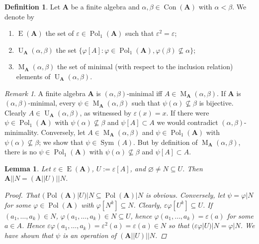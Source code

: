 \documentclass{amsart}
\theoremstyle{plain}
\newtheorem{lemma}[theorem]{Lemma}
\theoremstyle{definition}
\newtheorem{definition}[theorem]{Definition}
\theoremstyle{remark}
\newtheorem{remark}[theorem]{Remark}
\def\phi{\varphi}
\def\epsilon{\varepsilon}
\DeclareMathOperator{\Con}{Con}
\DeclareMathOperator{\Pol}{Pol}
\DeclareMathOperator{\Sym}{Sym}
\DeclareMathOperator{\Id}{E}
\DeclareMathOperator{\U}{U}
\DeclareMathOperator{\M}{M}
\begin{document}
\begin{definition}
    Let $\mathbf{A}$ be a finite algebra and $\alpha, \beta \in \Con(\mathbf{A})$ with $\alpha < \beta$. 
    We denote by
    \begin{enumerate}
        \item $\Id(\mathbf{A})$ the set of $ \epsilon \in \Pol_1(\mathbf{A})$ such that $\epsilon^2 = \epsilon$; 
        \item $\U_{\mathbf{A}}(\alpha, \beta)$ the set $\{\phi[A] : \phi \in \Pol_1(\mathbf{A}), \phi(\beta) \nsubseteq \alpha\}$; 
        \item $\M_{\mathbf{A}}(\alpha, \beta)$ the set of minimal (with respect to the inclusion relation) elements of $\U_{\mathbf{A}}(\alpha, \beta)$. 
    \end{enumerate}
\end{definition}

\begin{remark}
    A finite algebra $\mathbf{A}$ is $(\alpha, \beta)$-minimal iff $A \in \M_{\mathbf{A}}(\alpha, \beta)$. 
    If $\mathbf{A}$ is $(\alpha, \beta)$-minimal, every $\psi \in \M_{\mathbf{A}}(\alpha, \beta)$ such that $\psi(\alpha) \nsubseteq \beta$ is bijective. 
    Clearly $A \in \U_{\mathbf{A}}(\alpha, \beta)$, as witnessed by $\epsilon(x)=x$. 
    If there were $\psi \in \Pol_1(\mathbf{A})$ with $\psi(\alpha) \nsubseteq \beta$ and $\psi[A] \subset A$ we would contradict $(\alpha, \beta)$-minimality. 
    Conversely, let $A \in \M_{\mathbf{A}}(\alpha, \beta)$ and $\psi \in \Pol_1(\mathbf{A})$ with $\psi(\alpha) \nsubseteq \beta$; 
    we show that $\psi \in \Sym(A)$. 
    But by definition of $\M_{\mathbf{A}}(\alpha, \beta)$, there is no $\psi \in \Pol_1(\mathbf{A})$ with $\psi(\alpha) \nsubseteq \beta$ and $\psi[A] \subset A$. 
\end{remark}


\begin{lemma}
    \label{lemma_ex}
    Let $\epsilon \in \Id(\mathbf{A})$, $U:=\epsilon[A]$, and $\varnothing \neq N \subseteq U$.  
    Then $\mathbf{A}||N = (\mathbf{A}||U)||N$. 
    \begin{proof}
        That $(\Pol(\mathbf{A})|U)|N \subseteq \Pol(\mathbf{A})|N$ is obvious. 
        Conversely, let $\psi=\phi|N$ for some $\phi \in \Pol(\mathbf{A})$ with $\phi[N^k] \subseteq N$. 
        Clearly, $\epsilon \phi [U^k] \subseteq U$. 
        If $(a_1, \ldots, a_k) \in N$, $\phi(a_1, \ldots, a_k) \in N \subseteq U$, hence $\phi(a_1, \ldots, a_k) = \epsilon(a)$ for some $a \in A$. 
        Hence $\epsilon \phi(a_1, \ldots, a_k) = \epsilon^2(a)=\epsilon(a) \in N$ so that $(\epsilon \phi |U )|N = \phi|N$. 
        We have shown that $\psi$ is an operation of $(\mathbf{A}||U)||N$. 
    \end{proof}
\end{lemma}
\end{document}
